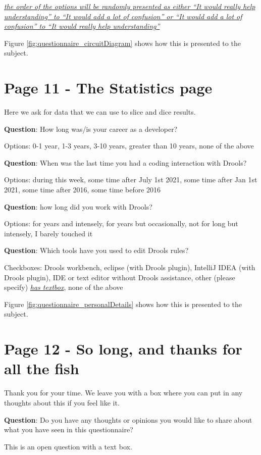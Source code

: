 \emph{\underline{the order of the options will be randomly presented as either ``It would really help understanding'' to ``It would add a lot of confusion'' or ``It would add a lot of confusion'' to ``It would really help understanding''}}

Figure \ref{fig:questionnaire_circuitDiagram} shows how this is presented to the subject.

\section*{Page 11 - The Statistics page}
Here we ask for data that we can use to slice and dice results.

\textbf{Question}: How long was/is your career as a developer?

Options: 0-1 year, 1-3 years, 3-10 years, greater than 10 years, none of the above

\textbf{Question}: When was the last time you had a coding interaction with Drools?

Options: during this week, some time after July 1st 2021, some time after Jan 1st 2021, some time after 2016, some time before 2016

\textbf{Question}: how long did you work with Drools?

Options: for years and intensely, for years but occasionally, not for long but intensely, I barely touched it


\textbf{Question}: Which tools have you used to edit Drools rules?

Checkboxes: Drools workbench, eclipse (with Drools plugin), IntelliJ IDEA (with Drools plugin), IDE or text editor without Drools assistance, other (please specify) \emph{\underline{has textbox}}, none of the above

Figure \ref{fig:questionnaire_personalDetails} shows how this is presented to the subject.

\section*{Page 12 - So long, and thanks for all the fish}
Thank you for your time.
We leave you with a box where you can put in any thoughts about this if you feel like it.

\textbf{Question}: Do you have any thoughts or opinions you would like to share about what you have seen in this questionnaire?

This is an open question with a text box.

